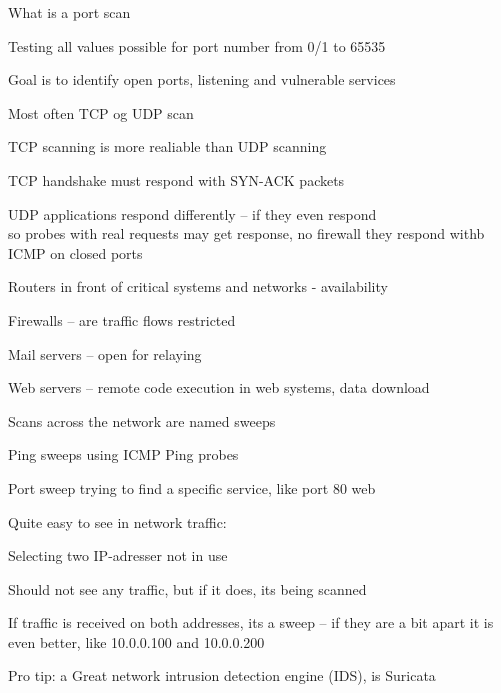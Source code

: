 \documentclass[Screen16to9,17pt]{foils}
\begin{document}
\begin{list1}
\item What is a port scan
\item Testing all values possible for port number from 0/1 to 65535
\item Goal is to identify open ports, listening and vulnerable services
\item Most often TCP og UDP scan
\item TCP scanning is more realiable than UDP scanning
\item TCP handshake must respond with SYN-ACK packets
\item UDP applications respond differently -- if they even respond\\
so probes with real requests may get response, no firewall they respond withb ICMP on closed ports
\end{list1}





\begin{list2}
\item Routers in front of critical systems and networks - availability
\item Firewalls -- are traffic flows restricted
\item Mail servers -- open for relaying
\item Web servers -- remote code execution in web systems, data download
\end{list2}


\begin{list1}
\item Scans across the network are named sweeps
\item Ping sweeps using ICMP Ping probes
\item Port sweep trying to find a specific service, like port 80 web
\item Quite easy to see in network traffic:
\begin{list2}
\item Selecting two IP-adresser not in use
\item Should not see any traffic, but if it does, its being scanned
\item If traffic is received on both addresses, its a sweep -- if they are a bit apart it is even better, like 10.0.0.100 and 10.0.0.200
  \end{list2}

\vskip 2cm
Pro tip: a Great network intrusion detection engine (IDS), is Suricata 
\end{list1}
\end{document}

